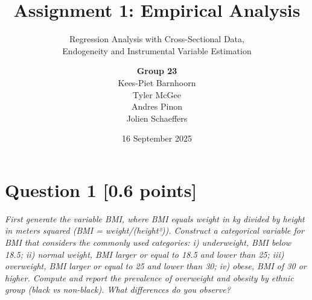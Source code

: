 \documentclass[paper=a4, DIV=12, fontsize=11pt, parskip=full]{scrartcl}
\title{Assignment 1: Empirical Analysis}
\subtitle{Regression Analysis with Cross-Sectional Data,\\
Endogeneity and Instrumental Variable Estimation}
\author{\textbf{Group 23}\\[0.5em]
    Kees-Piet Barnhoorn\\
    Tyler McGee\\
    Andres Pinon\\
    Jolien Schaeffers}
\date{16 September 2025}
\begin{document}
\maketitle

\section*{{Question 1 [0.6 points]}}
\textit{First generate the variable BMI, where BMI equals weight in kg divided by height in meters squared (BMI = weight/(height²)). Construct a categorical variable for BMI that considers the commonly used categories: i) underweight, BMI below 18.5; ii) normal weight, BMI larger or equal to 18.5 and lower than 25; iii) overweight, BMI larger or equal to 25 and lower than 30; iv) obese, BMI of 30 or higher. Compute and report the prevalence of overweight and obesity by ethnic group (black vs non-black). What differences do you observe?}
\end{document}
